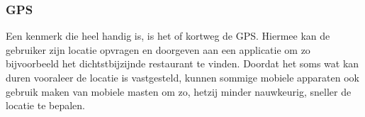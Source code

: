 % 
% 


\subsubsection{GPS}
Een kenmerk die heel handig is, is het  of kortweg de GPS. Hiermee kan de gebruiker zijn locatie opvragen en doorgeven aan een applicatie om zo bijvoorbeeld het dichtstbijzijnde restaurant te vinden. Doordat het soms wat kan duren vooraleer de locatie is vastgesteld, kunnen sommige mobiele apparaten ook gebruik maken van mobiele masten om zo, hetzij minder nauwkeurig, sneller de locatie te bepalen.


